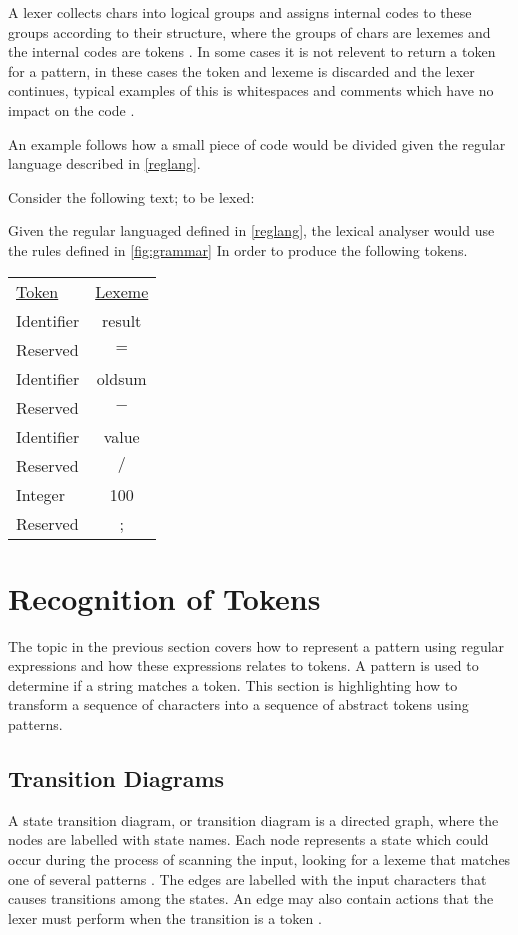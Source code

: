 A lexer collects chars into logical groups and assigns 
internal codes to these groups according to their structure, 
where the groups of chars are lexemes and the internal codes are tokens \cite{sebesta2012}.
In some cases it is not relevent to return a token for a pattern, in these
cases the token and lexeme is discarded and the lexer continues,
typical examples of this is whitespaces and comments which have no impact on
the code \cite{Aho2006}.

An example follows how a small piece of code would be divided given the regular
language described in \cref{reglang}.
\begin{example} \label{codeToToken}$ $\\
Consider the following text; to be lexed:

Given the regular languaged defined in \cref{reglang}, the lexical analyser would use the rules defined in \cref{fig:grammar}
In order to produce the following tokens.
\begin{center}
\begin{tabular}{l c}
\underline{Token} & \underline{Lexeme}\\
Identifier & result\\
Reserved & $=$\\
Identifier & oldsum\\
Reserved & $-$\\
Identifier & value\\
Reserved & $/$\\
Integer & 100\\
Reserved & ;
\end{tabular}
\end{center}
\end{example}

\section{Recognition of Tokens}
The topic in the previous section covers how to represent a pattern using 
regular expressions and how these expressions relates to tokens. A pattern is
used to determine if a string matches a token. This section is highlighting how
to transform a sequence of characters into a sequence of abstract tokens using
patterns. 

\subsection{Transition Diagrams}
A state transition diagram, or transition diagram is a directed graph, where the
nodes are labelled with state names. Each node represents a state which could
occur during the process of scanning the input, looking for a lexeme that
matches one of several patterns \cite{Aho2006}. The edges are labelled with the
input characters that causes transitions among the states. An edge may also
contain actions that the lexer must perform when the transition is a token 
\cite{sebesta2012}.

